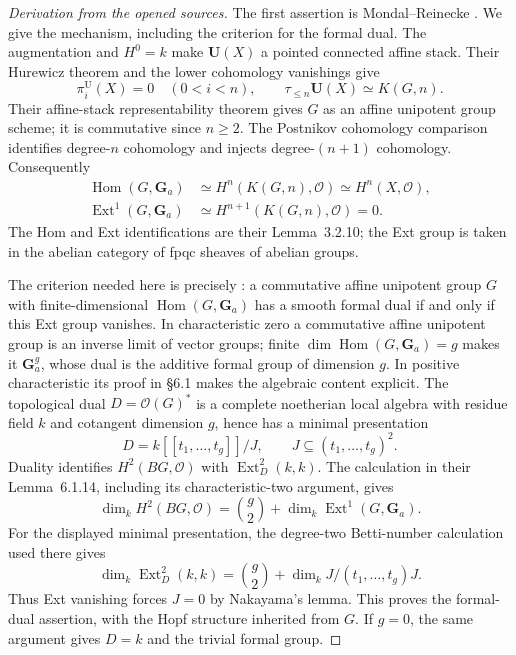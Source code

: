 \begin{proof}[Derivation from the opened sources]
The first assertion is Mondal--Reinecke
\cite[Proposition~6.2.5 and Construction~6.2.6, p.~76]{BMondalReinecke2026}.
We give the mechanism, including the criterion for the formal dual.
The augmentation and $H^0=k$ make $\mathbf U(X)$ a pointed connected
affine stack.  Their Hurewicz theorem
\cite[Proposition~3.2.11 and Corollary~3.2.12]{BMondalReinecke2026}
and the lower cohomology vanishings give
\[
 \pi_i^{\mathrm U}(X)=0\quad(0<i<n),
 \qquad \tau_{\leq n}\mathbf U(X)\simeq K(G,n).
\]
Their affine-stack representability theorem gives $G$ as an affine
unipotent group scheme; it is commutative since $n\geq2$.
The Postnikov cohomology comparison
\cite[Proposition~2.1.19]{BMondalReinecke2026}
identifies degree-$n$ cohomology and injects degree-$(n+1)$ cohomology.
Consequently
\[
 \begin{aligned}
 \operatorname{Hom}(G,\mathbf G_a)
  &\simeq H^n(K(G,n),\mathcal O)
   \simeq H^n(X,\mathcal O),\\
 \operatorname{Ext}^1(G,\mathbf G_a)
  &\simeq H^{n+1}(K(G,n),\mathcal O)=0.
 \end{aligned}
\]
The Hom and Ext identifications are their Lemma~3.2.10; the Ext group
is taken in the abelian category of fpqc sheaves of abelian groups.

The criterion needed here is precisely
\cite[Proposition~6.1.13]{BMondalReinecke2026}:
a commutative affine unipotent group $G$ with finite-dimensional
$\operatorname{Hom}(G,\mathbf G_a)$ has a smooth formal dual if and
only if this Ext group vanishes.  In characteristic zero a commutative
affine unipotent group is an inverse limit of vector groups; finite
$\dim\operatorname{Hom}(G,\mathbf G_a)=g$ makes it $\mathbf G_a^g$,
whose dual is the additive formal group of dimension $g$.
In positive characteristic its proof in \S6.1 makes the
algebraic content explicit.  The topological dual $D=\mathcal O(G)^*$
is a complete noetherian local algebra with residue field $k$ and
cotangent dimension $g$, hence has a minimal presentation
\[
 D=k[[t_1,\ldots,t_g]]/J,\qquad J\subseteq(t_1,\ldots,t_g)^2.
\]
Duality identifies $H^2(BG,\mathcal O)$ with
$\operatorname{Ext}^2_D(k,k)$.  The calculation in their
Lemma~6.1.14, including its characteristic-two argument, gives
\[
 \dim_k H^2(BG,\mathcal O)
 =\binom g2+\dim_k\operatorname{Ext}^1(G,\mathbf G_a).
\]
For the displayed minimal presentation, the degree-two Betti-number
calculation used there gives
\[
 \dim_k\operatorname{Ext}^2_D(k,k)
 =\binom g2+\dim_k J/(t_1,\ldots,t_g)J.
\]
Thus Ext vanishing forces $J=0$ by Nakayama's lemma.  This proves the
formal-dual assertion, with the Hopf structure inherited from $G$.
If $g=0$, the same argument gives $D=k$ and the trivial formal group.


\end{proof}

